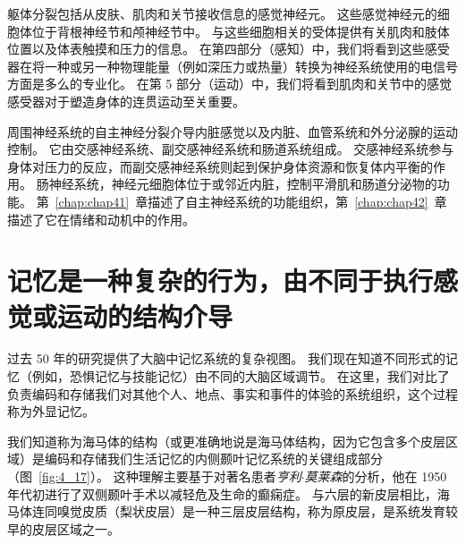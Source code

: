 躯体分裂包括从皮肤、肌肉和关节接收信息的感觉神经元。 
这些感觉神经元的细胞体位于背根神经节和颅神经节中。 与这些细胞相关的受体提供有关肌肉和肢体位置以及体表触摸和压力的信息。 
在第四部分（感知）中，我们将看到这些感受器在将一种或另一种物理能量（例如深压力或热量）转换为神经系统使用的电信号方面是多么的专业化。 
在第 5 部分（运动）中，我们将看到肌肉和关节中的感觉感受器对于塑造身体的连贯运动至关重要。


周围神经系统的自主神经分裂介导内脏感觉以及内脏、血管系统和外分泌腺的运动控制。
它由交感神经系统、副交感神经系统和肠道系统组成。 
交感神经系统参与身体对压力的反应，而副交感神经系统则起到保护身体资源和恢复体内平衡的作用。
肠神经系统，神经元细胞体位于或邻近内脏，控制平滑肌和肠道分泌物的功能。 
第~\ref{chap:chap41}~章描述了自主神经系统的功能组织，第~\ref{chap:chap42}~章描述了它在情绪和动机中的作用。



\section{记忆是一种复杂的行为，由不同于执行感觉或运动的结构介导}

过去 50 年的研究提供了大脑中记忆系统的复杂视图。 
我们现在知道不同形式的记忆（例如，恐惧记忆与技能记忆）由不同的大脑区域调节。
在这里，我们对比了负责编码和存储我们对其他个人、地点、事实和事件的体验的系统组织，这个过程称为外显记忆。


我们知道称为海马体的结构（或更准确地说是海马体结构，因为它包含多个皮层区域）是编码和存储我们生活记忆的内侧颞叶记忆系统的关键组成部分（图~\ref{fig:4_17}）。 
这种理解主要基于对著名患者\textit{亨利$\cdot$莫莱森}的分析，他在 1950 年代初进行了双侧颞叶手术以减轻危及生命的癫痫症。
与六层的新皮层相比，海马体连同嗅觉皮质（梨状皮层）是一种三层皮层结构，称为原皮层，是系统发育较早的皮层区域之一。


